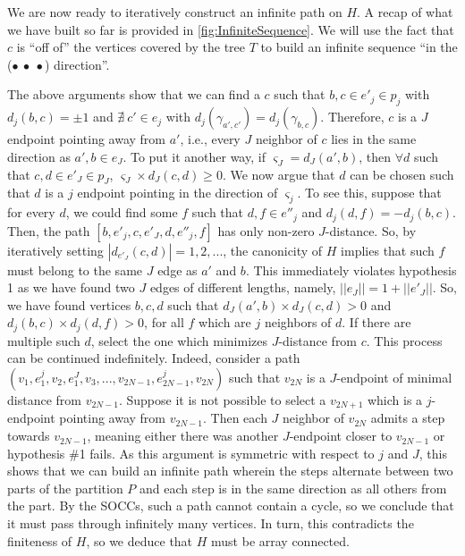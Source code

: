 \documentclass{article}
\theoremstyle{plain}
\theoremstyle{definition}
\theoremstyle{remark}
\begin{document}
	We are now ready to iteratively construct an infinite path on $H$. A recap of what we have built so far is provided in \cref{fig:InfiniteSequence}. We will use the fact that $c$ is ``off of'' the vertices covered by the tree $T$ to build an infinite sequence ``in the ({\color{darkgray}$\bullet \ \bullet \ \bullet$}) direction''.
	
	The above arguments show that we can find a $c$ such that $b, c \in e'_j \in p_j$ with $d_j(b, c) = \pm 1$ and $\nexists \ c' \in e_j$ with $d_j(\gamma_{a', c'}) = d_j(\gamma_{b, c})$. Therefore, $c$ is a $J$ endpoint pointing away from $a'$, i.e., every $J$ neighbor of $c$ lies in the same direction as $a', b \in e_J$. To put it another way, if $\varsigma_J = d_J(a', b)$, then $\forall d$ such that $c, d \in e'_J \in p_J$, $\varsigma_J \times d_J(c, d) \geq 0$. We now argue that $d$ can be chosen such that $d$ is a $j$ endpoint pointing in the direction of $\varsigma_j$. To see this, suppose that for every $d$, we could find some $f$ such that $d, f \in e''_j$ and $d_j(d, f) = -d_j(b, c)$. Then, the path $[b, e'_j, c, e'_J, d, e''_j, f]$ has only non-zero $J$-distance. So, by iteratively setting $|d_{e'_J}(c, d)| = 1, 2, ...$, the canonicity of $H$ implies that such $f$ must belong to the same $J$ edge as $a'$ and $b$. This immediately violates hypothesis 1 as we have found two $J$ edges of different lengths, namely, $||e_J|| = 1 + ||e'_J||$. So, we have found vertices $b, c, d$ such that $d_J(a', b) \times d_J(c, d) > 0$ and $d_j(b, c) \times d_j(d, f) > 0$, for all $f$ which are $j$ neighbors of $d$. If there are multiple such $d$, select the one which minimizes $J$-distance from $c$. This process can be continued indefinitely. Indeed, consider a path $(v_1, e^j_1, v_2, e^J_1, v_3, ..., v_{2N-1}, e^j_{2N-1}, v_{2N})$ such that $v_{2N}$ is a $J$-endpoint of minimal distance from $v_{2N-1}$. Suppose it is not possible to select a $v_{2N+1}$ which is a $j$-endpoint pointing away from $v_{2N-1}$. Then each $J$ neighbor of $v_{2N}$ admits a step towards $v_{2N-1}$, meaning either there was another $J$-endpoint closer to $v_{2N-1}$ or hypothesis \#1 fails. As this argument is symmetric with respect to $j$ and $J$, this shows that we can build an infinite path wherein the steps alternate between two parts of the partition $P$ and each step is in the same direction as all others from the part. By the SOCCs, such a path cannot contain a cycle, so we conclude that it must pass through infinitely many vertices. In turn, this contradicts the finiteness of $H$, so we deduce that $H$ must be array connected.
	
\end{document}
